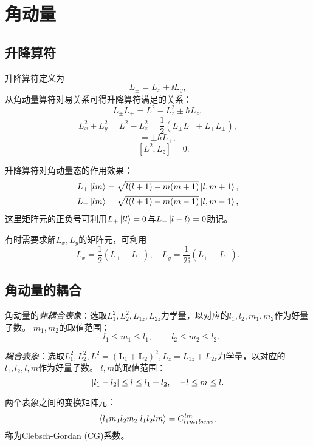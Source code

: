 \section{角动量}

\subsection{升降算符}

升降算符定义为
\begin{equation}
    L_\pm = L_x \pm \ii L_y,
\end{equation}
从角动量算符对易关系可得升降算符满足的关系：
\begin{equation}
    L_\pm L_\mp = L^2 - L_z^2 \pm \hbar L_z,
\end{equation}
\begin{equation}
    L_x^2 + L_y^2 = L^2 - L_z^2 = \frac12 \left(L_\pm L_\mp + L_\mp L_\pm \right),
\end{equation}
\begin{equation}
    [L_z, L_\pm] = \pm \hbar L_\pm,
\end{equation}
\begin{equation}
    [L^2, L_\pm] = [L^2, L_z] = 0.
\end{equation}

升降算符对角动量态的作用效果：
\begin{equation}
\begin{aligned}
    L_+ \ket{lm} &= \sqrt{l(l + 1) - m(m + 1)} \ket{l, m+1},\\
    L_- \ket{lm} &= \sqrt{l(l + 1) - m(m - 1)} \ket{l, m-1},
\end{aligned}
\end{equation}
这里矩阵元的正负号可利用$L_+\ket{ll}=0$与$L_-\ket{l-l}=0$助记。

有时需要求解$L_x, L_y$的矩阵元，可利用
\begin{equation}
    L_x = \frac12 (L_+ + L_-), \quad L_y = \frac{1}{2\ii} (L_+ - L_-).
\end{equation}

\subsection{角动量的耦合}

角动量的\emph{非耦合表象}：选取$L_1^2, L_2^2, L_{1z}, L_{2z}$力学量，以对应的$l_1,l_2,m_1,m_2$作为好量子数。
$m_1, m_2$的取值范围：
\begin{equation}
    -l_1 \le m_1 \le l_1,\quad -l_2 \le m_2 \le l_2.
\end{equation}

\emph{耦合表象}：选取$L_1^2, L_2^2, L^2=(\bm{L}_1 +\bm{L}_2)^2, L_z = L_{1z} + L_{2z}$力学量，以对应的$l_1,l_2,l,m$作为好量子数。
$l,m$的取值范围：
\begin{equation}
    \abs{l_1-l_2}\le l \le l_1+l_2,\quad -l \le m \le l.
\end{equation}

两个表象之间的变换矩阵元：
\begin{equation}
    \braket{l_1m_1l_2m_2}{l_1l_2lm} = C_{l_1m_1l_2m_2}^{lm},
\end{equation}
称为Clebsch-Gordan (CG)系数。
